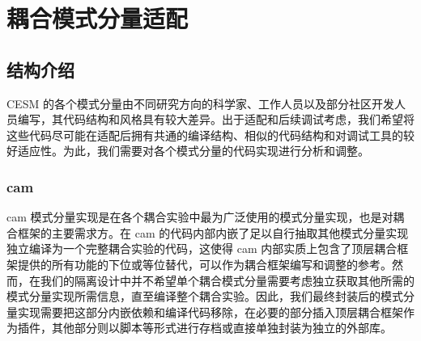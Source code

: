 \chapter{耦合模式分量适配}
\label{cha:refactor}

\section{结构介绍}

CESM 的各个模式分量由不同研究方向的科学家、工作人员以及部分社区开发人员编写，其代码结构和风格具有较大差异。出于适配和后续调试考虑，我们希望将这些代码尽可能在适配后拥有共通的编译结构、相似的代码结构和对调试工具的较好适应性。为此，我们需要对各个模式分量的代码实现进行分析和调整。

\subsection{cam}

cam 模式分量实现是在各个耦合实验中最为广泛使用的模式分量实现，也是对耦合框架的主要需求方。在 cam 的代码内部内嵌了足以自行抽取其他模式分量实现独立编译为一个完整耦合实验的代码，这使得 cam 内部实质上包含了顶层耦合框架提供的所有功能的下位或等位替代，可以作为耦合框架编写和调整的参考。然而，在我们的隔离设计中并不希望单个耦合模式分量需要考虑独立获取其他所需的模式分量实现所需信息，直至编译整个耦合实验。因此，我们最终封装后的模式分量实现需要把这部分内嵌依赖和编译代码移除，在必要的部分插入顶层耦合框架作为插件，其他部分则以脚本等形式进行存档或直接单独封装为独立的外部库。

